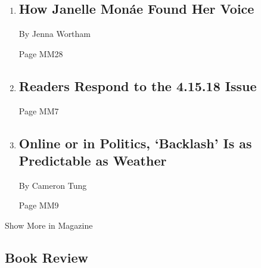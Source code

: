 \begin{enumerate}
\def\labelenumi{\arabic{enumi}.}
\item
  \href{/2018/04/19/magazine/how-janelle-monae-found-her-voice.html}{}

  \hypertarget{how-janelle-monuxe1e-found-her-voice-1}{%
  \subsection{How Janelle Monáe Found Her
  Voice}\label{how-janelle-monuxe1e-found-her-voice-1}}

  By Jenna Wortham

  Page MM28
\item
  \href{/2018/04/25/magazine/readers-respond-to-the-4-15-18-issue.html}{}

  \hypertarget{readers-respond-to-the-41518-issue}{%
  \subsection{Readers Respond to the 4.15.18
  Issue}\label{readers-respond-to-the-41518-issue}}

  Page MM7
\item
  \href{/2018/04/24/magazine/online-or-in-politics-backlash-is-as-predictable-as-weather.html}{}

  \hypertarget{online-or-in-politics-backlash-is-as-predictable-as-weather}{%
  \subsection{Online or in Politics, `Backlash' Is as Predictable as
  Weather}\label{online-or-in-politics-backlash-is-as-predictable-as-weather}}

  By Cameron Tung

  Page MM9
\end{enumerate}

Show More in Magazine

\hypertarget{book-review}{%
\subsection{Book Review}\label{book-review}}

